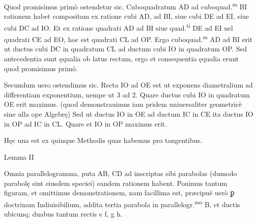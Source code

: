 \documentclass[11pt,a4paper]{article}
\begin{document}

Quod promisimus primò ostendetur sic. Cuboquadratum AD ad cuboquad.\textsuperscript{m} BI rationem habet compositam ex ratione cubi AD, ad BI, siue cubi DE ad EI, siue cubi DC ad IO. Et ex ratione quadrati AD ad BI siue quad.\textsuperscript{ti} DE ad EI uel quadrati CE ad EO, hoc est quadrati CL ad OP. Ergo cuboquad.\textsuperscript{m} AD ad BI erit ut ductus cubi DC in quadratum CL ad ductum cubi IO in quadratum OP. Sed antecedentia sunt ęqualia ob latus rectum, ergo et consequentia ęqualia erunt quod promisimus primò.

Secundum uero ostendimus sic. Recta IO ad OE est ut exponens diametralium ad differentiam exponentium, nempe ut 3 ad 2. Quare ductus cubi IO in quadratum OE erit maximus. (quod demonstrauimus iam pridem uniuersaliter geometricè sine ulla ope Algebrę) Sed ut ductus IO in OE ad ductum IC in CE ita ductus IO in OP ad IC in CL. Quare et IO in OP maximus erit.

Hęc una est ex quinque Methodis quas habemus pro tangentibus.

Lemma II

Omnia parallelogramma, puta AB, CD ad inscriptas sibi parabolas (dumodo parabolę sint eiusdem speciei) eandem rationem habent. Ponimus tantum figuram, et omittimus demonstrationem, nam facillima est, præcipuè uerò ꝑ doctrinam Indiuisibilium, addita tertia parabola in parallelogr.\textsuperscript{mo} B, et ductis ubicunq; duabus tantum rectis e f, g h. \ill{}
\end{document}
